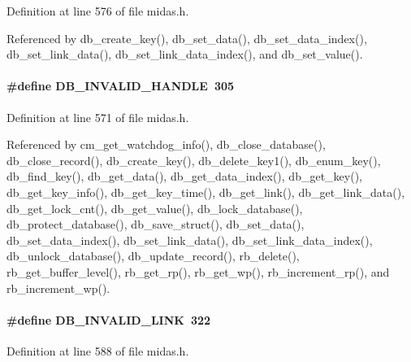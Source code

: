 Definition at line 576 of file midas.h.

Referenced by db\_\-create\_\-key(), db\_\-set\_\-data(), db\_\-set\_\-data\_\-index(), db\_\-set\_\-link\_\-data(), db\_\-set\_\-link\_\-data\_\-index(), and db\_\-set\_\-value().
\paragraph[{DB\_\-INVALID\_\-HANDLE}]{\setlength{\rightskip}{0pt plus 5cm}\#define DB\_\-INVALID\_\-HANDLE~305}\hfill\label{group__err23_ga2b43bd45a32dd2121296f02c267ccc6d}

\begin{DoxyItemize}
\item 
\end{DoxyItemize}

Definition at line 571 of file midas.h.

Referenced by cm\_\-get\_\-watchdog\_\-info(), db\_\-close\_\-database(), db\_\-close\_\-record(), db\_\-create\_\-key(), db\_\-delete\_\-key1(), db\_\-enum\_\-key(), db\_\-find\_\-key(), db\_\-get\_\-data(), db\_\-get\_\-data\_\-index(), db\_\-get\_\-key(), db\_\-get\_\-key\_\-info(), db\_\-get\_\-key\_\-time(), db\_\-get\_\-link(), db\_\-get\_\-link\_\-data(), db\_\-get\_\-lock\_\-cnt(), db\_\-get\_\-value(), db\_\-lock\_\-database(), db\_\-protect\_\-database(), db\_\-save\_\-struct(), db\_\-set\_\-data(), db\_\-set\_\-data\_\-index(), db\_\-set\_\-link\_\-data(), db\_\-set\_\-link\_\-data\_\-index(), db\_\-unlock\_\-database(), db\_\-update\_\-record(), rb\_\-delete(), rb\_\-get\_\-buffer\_\-level(), rb\_\-get\_\-rp(), rb\_\-get\_\-wp(), rb\_\-increment\_\-rp(), and rb\_\-increment\_\-wp().
\paragraph[{DB\_\-INVALID\_\-LINK}]{\setlength{\rightskip}{0pt plus 5cm}\#define DB\_\-INVALID\_\-LINK~322}\hfill\label{group__err23_gac76d78c0ecc26f907b9996eb5ad1d86b}

\begin{DoxyItemize}
\item 
\end{DoxyItemize}

Definition at line 588 of file midas.h.

